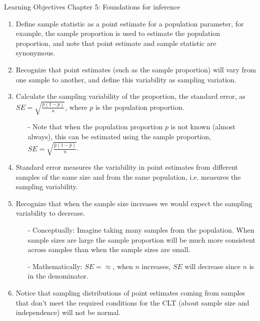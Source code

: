 \documentclass[11pt]{article}
\begin{document}
{\LARGE \textcolor{oiB}{Learning Objectives \hfill Chapter 5: Foundations for inference}} \\

%

\begin{enumerate}
\renewcommand\labelenumi{\textcolor{light}{\textbf{LO \theenumi.}}}

\item Define sample statistic as a point estimate for a population parameter, for example, the sample proportion is used to estimate the population proportion, and note that point estimate and sample statistic are synonymous.

\item Recognize that point estimates (such as the sample proportion) will vary from one sample to another, and define this variability as sampling variation.

\item Calculate the sampling variability of the proportion, the standard error, as $SE = \sqrt{\frac{p(1-p)}{n}}$, where $p$ is the population proportion.
\begin{itemize}
\item[-] Note that when the population proportion $p$ is not known (almost always), this can be estimated using the sample proportion, $SE = \sqrt{\frac{\hat{p}(1-\hat{p})}{n}}$.
\end{itemize}

\item Standard error measures the variability in point estimates from different samples of the same size and from the same population, i.e. measures the sampling variability.

\item Recognize that when the sample size increases we would expect the sampling variability to decrease.
\begin{itemize}
\item[-] Conceptually: Imagine taking many samples from the population. When sample sizes are large the sample proportion will be much more consistent across samples than when the sample sizes are small.
\item[-] Mathematically: $SE = ≈$, when $n$ increases, $SE$ will decrease since $n$ is in the denominator.
\end{itemize}

\item Notice that sampling distributions of point estimates coming from samples that don't meet the required conditions for the CLT (about sample size and independence) will not be normal.

\end{enumerate}
\end{document}
